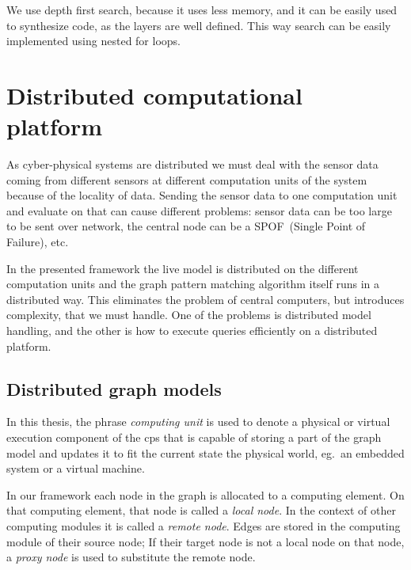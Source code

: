 We use depth first search, because it uses less memory, and it can be easily used to synthesize code, as the layers are well defined. This way search can be easily implemented using nested for loops.


\section{Distributed computational platform}


As cyber-physical systems are distributed we must deal with the sensor data coming from different sensors at different computation units of the system because of the locality of data. 
Sending the sensor data to one computation unit and evaluate on that can cause different problems: 
sensor data can be too large to be sent over network, the central node can be a SPOF~(Single Point of Failure), etc. 

In the presented framework the live model is distributed on the different computation units and the graph pattern matching algorithm itself runs in a distributed way. 
This eliminates the problem of central computers, but introduces complexity, that we must handle.
One of the problems is distributed model handling, and the other is how to execute queries efficiently on a distributed platform.





\subsection{Distributed graph models}

In this thesis, the phrase \emph{computing unit} is used to denote a physical or virtual execution component of the cps that is capable of storing a part of the graph model and updates it to fit the current state the physical world, eg.\ an embedded system or a virtual machine.

In our framework each node in the graph is allocated to a computing element. 
On that computing element, that node is called a \emph{local node}. 
In the context of other computing modules it is called a \emph{remote node}. 
Edges are stored in the computing module of their source node; 
If their target node is not a local node on that node, a \emph{proxy node} is used to substitute the remote node.



